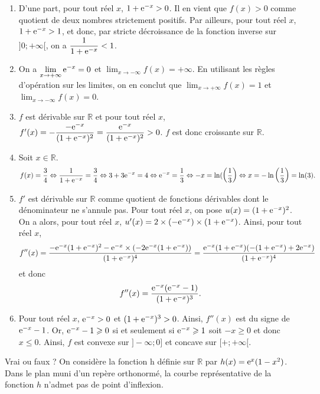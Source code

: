 \documentclass[11pt,fleqn, openany]{book} %
\begin{document}
\begin{solution}\hspace{0pt} 
\begin{enumerate}
\item D'une part, pour tout réel $x$, $1+\mathrm{e}^{-x}>0$. Il en vient que $f(x)>0$ comme quotient de deux nombres strictement positifs. Par ailleurs, pour tout réel $x$, $1+\mathrm{e}^{-x}>1$, et donc, par stricte décroissance de la fonction inverse sur $]0;+\infty[$, on a $\dfrac{1}{1+\mathrm{e}^{-x}}<1$.
\item On a $\displaystyle\lim_{x\to+\infty}\mathrm{e}^{-x}=0$ et $\displaystyle\lim_{x\to -\infty}f(x)=+\infty$. En utilisant les règles d'opération sur les limites, on en conclut que $\displaystyle\lim_{x\to +\infty}f(x)=1$ et $\displaystyle\lim_{x\to -\infty}f(x)=0$.
\item $f$ est dérivable sur $\mathbb{R}$ et pour tout réel $x$, $f'(x)=-\dfrac{-\mathrm{e}^{-x}}{(1+\mathrm{e}^{-x})^2}=\dfrac{\mathrm{e}^{-x}}{(1+\mathrm{e}^{-x})^2}>0$. $f$ est donc croissante sur $\mathbb{R}$.
\item Soit $x\in\mathbb{R}$.
\[f(x)=\dfrac{3}{4}\Leftrightarrow \dfrac{1}{1+\mathrm{e}^{-x}} = \dfrac{3}{4} \Leftrightarrow 3+3\mathrm{e}^{-x} = 4 \Leftrightarrow \mathrm{e}^{-x}=\dfrac{1}{3} \Leftrightarrow -x=\ln(\left(\dfrac{1}{3}\right) \Leftrightarrow x = -\ln\left(\dfrac{1}{3}\right)=\ln(3).\]
\item $f'$ est dérivable sur $\mathbb{R}$ comme quotient de fonctions dérivables dont le dénominateur ne s'annule pas. Pour tout réel $x$, on pose $u(x)=(1+\mathrm{e}^{-x})^2$. On a alors, pour tout réel $x$, $u'(x)=2 \times (-\mathrm{e}^{-x}) \times (1+\mathrm{e}^{-x})$. Ainsi, pour tout réel $x$,
\[f''(x)=\dfrac{-\mathrm{e}^{-x}(1+\mathrm{e}^{-x})^2-\mathrm{e}^{-x}\times(-2\mathrm{e}^{-x}(1+\mathrm{e}^{-x}))}{(1+\mathrm{e}^{-x})^4}=\dfrac{\mathrm{e}^{-x}(1+\mathrm{e}^{-x})(-(1+\mathrm{e}^{-x})+2\mathrm{e}^{-x})}{(1+\mathrm{e}^{-x})^4}\]
et donc 
\[f''(x)=\dfrac{\mathrm{e}^{-x}(\mathrm{e}^{-x}-1)}{(1+\mathrm{e}^{-x})^3}.\]
\item Pour tout réel $x$, $\mathrm{e}^{-x}>0$ et $(1+\mathrm{e}^{-x})^3>0$. Ainsi, $f''(x)$ est du signe de $\mathrm{e}^{-x}-1$. Or, $\mathrm{e}^{-x}-1\geqslant 0$ si et seulement si $\mathrm{e}^{-x}\geqslant 1$ soit $-x\geqslant 0$ et donc $x\leqslant 0$. Ainsi, $f$ est convexe sur $]-\infty;0]$ et concave sur $[+;+\infty[$.
\end{enumerate}\end{solution}



\begin{exercise}[subtitle={(Amérique du Nord 2022)}]Vrai ou faux ? On considère la fonction h définie sur $\mathbb{R}$ par  $h(x) = \mathrm{e}^x(1-x^2)$. Dans le plan muni d'un repère orthonormé, la courbe représentative de la fonction $h$ n'admet pas de point d'inflexion.\end{exercise}
\end{document}
